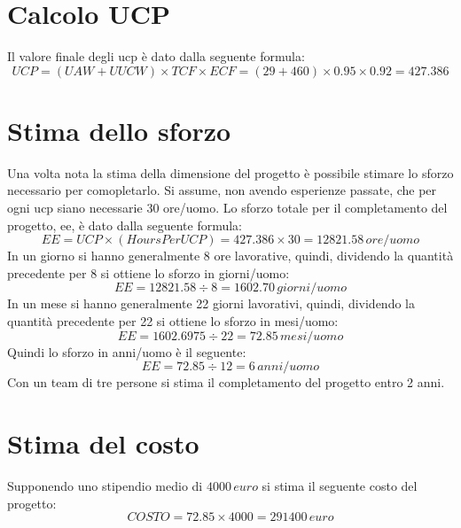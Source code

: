 \section{Calcolo UCP}
Il valore finale degli \acrfull{ucp} è dato dalla seguente formula:
\begin{displaymath}
	UCP = (UAW + UUCW) \times TCF \times ECF = (29 + 460) \times 0.95 \times 0.92 = 427.386 
\end{displaymath}

\section{Stima dello sforzo}
Una volta nota la stima della dimensione del progetto è possibile stimare lo sforzo necessario per comopletarlo.
Si assume, non avendo esperienze passate, che per ogni \gls{ucp} siano necessarie 30 ore/uomo.
Lo sforzo totale per il completamento del progetto, \gls{ee}, è dato dalla seguente formula:
\begin{displaymath}
	EE = UCP \times (Hours Per UCP) = 427.386 \times 30 = 12821.58\, ore/uomo
\end{displaymath}
In un giorno si hanno generalmente 8 ore lavorative, quindi, dividendo la quantità precedente per 8 si ottiene lo sforzo in giorni/uomo:
\begin{displaymath}
	EE = 12821.58 \div 8 = 1602.70\, giorni/uomo
\end{displaymath}
In un mese si hanno generalmente 22 giorni lavorativi, quindi, dividendo la quantità precedente per 22 si ottiene lo sforzo in mesi/uomo:
\begin{displaymath}
	EE = 1602.6975 \div 22 = 72.85\, mesi/uomo
\end{displaymath}
Quindi lo sforzo in anni/uomo è il seguente:
\begin{displaymath}
	EE = 72.85 \div 12 = 6\, anni/uomo
\end{displaymath}
Con un team di tre persone si stima il completamento del progetto entro 2 anni.

\section{Stima del costo}
Supponendo uno stipendio medio di \(4000\, euro\) si stima il seguente costo del progetto:
\begin{displaymath}
	COSTO = 72.85 \times 4000 = 291400\, euro
\end{displaymath}